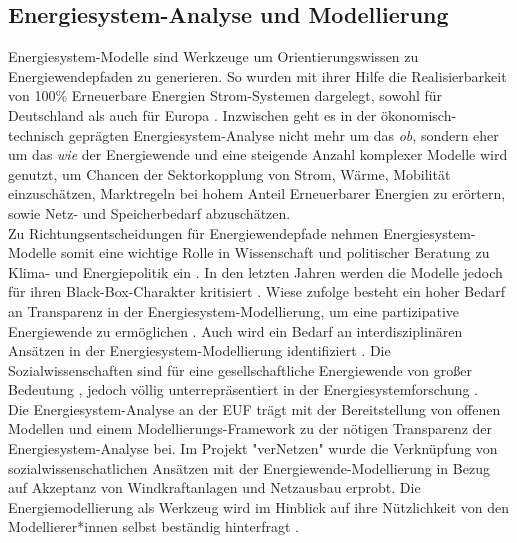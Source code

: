 \documentclass[a4paper,11pt,twoside]{scrartcl}
\begin{document}
\subsection*{Energiesystem-Analyse und Modellierung}
Energiesystem-Modelle sind Werkzeuge um Orientierungswissen zu Energiewendepfaden zu generieren. So wurden mit ihrer Hilfe die Realisierbarkeit von 100\% Erneuerbare Energien Strom-Systemen dargelegt, sowohl für Deutschland \cite{SRU2011} als auch für Europa \cite{Hohmeyer2015}. Inzwischen geht es in der ökonomisch-technisch geprägten Energiesystem-Analyse nicht mehr um das \textit{ob}, sondern eher um das \textit{wie} der Energiewende und  eine steigende Anzahl komplexer Modelle wird genutzt, um Chancen der Sektorkopplung von Strom, Wärme, Mobilität \cite{Quaschning2016} einzuschätzen, Marktregeln bei hohem Anteil Erneuerbarer Energien zu erörtern, sowie Netz- \cite{openEgo2015} und Speicherbedarf \cite{ANGUS2017} abzuschätzen. \\
Zu Richtungsentscheidungen für Energiewendepfade nehmen Energiesystem-Modelle somit eine wichtige Rolle in Wissenschaft und politischer Beratung zu Klima- und Energiepolitik ein \cite{Dieckhoff2015}. In den letzten Jahren werden die Modelle jedoch für ihren Black-Box-Charakter kritisiert \cite{Pfenninger2017, Pfenninger2017b,Cao2016}. Wiese \citep{Wiese2015} zufolge besteht ein hoher Bedarf an Transparenz in der Energiesystem-Modellierung, um eine partizipative Energiewende zu ermöglichen \cite{Wiese2014}. Auch wird ein Bedarf an interdisziplinären Ansätzen in der Energiesystem-Modellierung identifiziert \cite{Wiese2018,Pfenninger2014,Schuitema2017}. Die  Sozialwissenschaften sind für eine gesellschaftliche Energiewende von großer Bedeutung \cite{Sovacool2015}, jedoch völlig unterrepräsentiert in der Energiesystemforschung \cite{Sovacool2014}.\\
Die Energiesystem-Analyse an der EUF trägt mit der Bereitstellung von offenen Modellen \cite{renpass,renpassGIS} und einem Modellierungs-Framework \cite{oemof} zu der nötigen Transparenz der Energiesystem-Analyse bei. Im Projekt "verNetzen" \cite{vernetzen2016} wurde die Verknüpfung von sozialwissenschatlichen Ansätzen mit der Energiewende-Modellierung in Bezug auf Akzeptanz von Windkraftanlagen und Netzausbau erprobt. Die Energiemodellierung als Werkzeug wird im Hinblick auf ihre Nützlichkeit von den Modellierer*innen selbst beständig hinterfragt \cite{Wiese2018}.
\end{document}
